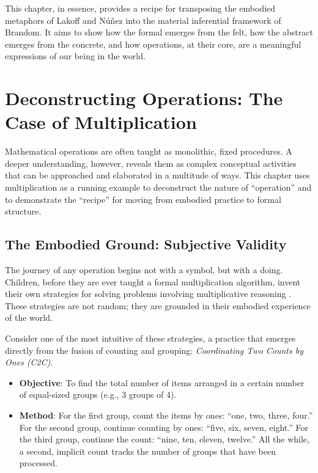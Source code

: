 \documentclass[12pt]{book}
\begin{document}
This chapter, in essence, provides a recipe for transposing the embodied metaphors of Lakoff and Núñez into the material inferential framework of Brandom. It aims to show how the formal emerges from the felt, how the abstract emerges from the concrete, and how operations, at their core, are a meaningful expressions of our being in the world.

\section{Deconstructing Operations: The Case of Multiplication}

Mathematical operations are often taught as monolithic, fixed procedures. A deeper understanding, however, reveals them as complex conceptual activities that can be approached and elaborated in a multitude of ways. This chapter uses multiplication as a running example to deconstruct the nature of ``operation'' and to demonstrate the ``recipe'' for moving from embodied practice to formal structure.

\subsection{The Embodied Ground: Subjective Validity}

The journey of any operation begins not with a symbol, but with a doing. Children, before they are ever taught a formal multiplication algorithm, invent their own strategies for solving problems involving multiplicative reasoning \parencite{Carpenter1999}. These strategies are not random; they are grounded in their embodied experience of the world.

Consider one of the most intuitive of these strategies, a practice that emerges directly from the fusion of counting and grouping: \textit{Coordinating Two Counts by Ones (C2C)}.

\begin{itemize}
 \item \textbf{Objective}: To find the total number of items arranged in a certain number of equal-sized groups (e.g., 3 groups of 4).
 \item \textbf{Method}: For the first group, count the items by ones: ``one, two, three, four.'' For the second group, continue counting by ones: ``five, six, seven, eight.'' For the third group, continue the count: ``nine, ten, eleven, twelve.'' All the while, a second, implicit count tracks the number of groups that have been processed.
\end{itemize}
\end{document}
